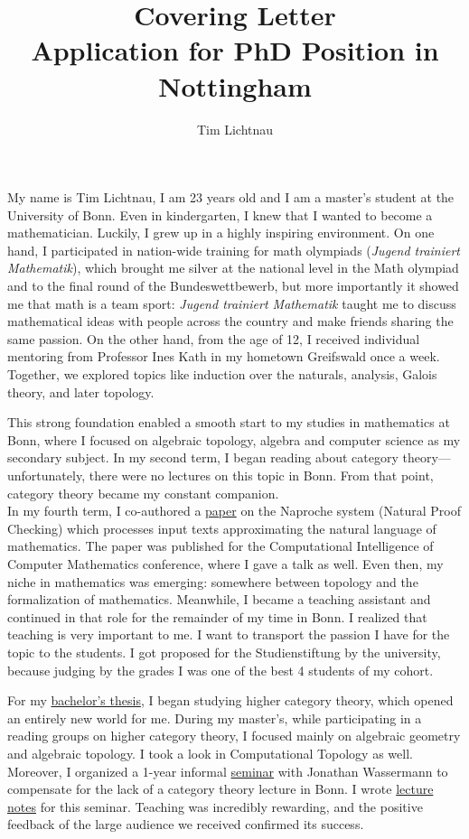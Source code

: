 \documentclass[12pt,headings=small,paper=A4,DIV=calc]{article}
\title{Covering Letter \\ Application for PhD Position in Nottingham}
\author{Tim Lichtnau}
\begin{document}
\maketitle
My name is Tim Lichtnau, I am 23 years old and I am a master's student at the University of Bonn. Even in kindergarten, I knew that I wanted to become a mathematician. Luckily, I grew up in a highly inspiring environment. On one hand, I participated in nation-wide training for math olympiads (\emph{Jugend trainiert Mathematik}), which brought me silver at the national level in the Math olympiad and to the final round of the Bundeswettbewerb, but more importantly it showed me that math is a team sport: \emph{Jugend trainiert Mathematik} taught me to discuss mathematical ideas with people across the country and make friends sharing the same passion. On the other hand, from the age of 12, I received individual mentoring from Professor Ines Kath in my hometown Greifswald once a week. Together, we explored topics like induction over the naturals, analysis, Galois theory, and later topology. 

This strong foundation enabled a smooth start to my studies in mathematics at Bonn, where I focused on algebraic topology, algebra and computer science as my secondary subject. In my second term, I began reading about category theory---unfortunately, there were no lectures on this topic in Bonn. From that point, category theory became my constant companion. \\
In my fourth term, I co-authored a \href{https://ceur-ws.org/Vol-3377/natfom2.pdf}{paper} on the Naproche system (Natural Proof Checking) which processes input texts approximating the natural language of mathematics. The paper was published for the Computational Intelligence of Computer Mathematics conference, where I gave a talk as well. Even then, my niche in mathematics was emerging: somewhere between topology and the formalization of mathematics. Meanwhile, I became a teaching assistant and continued in that role for the remainder of my time in Bonn. I realized that teaching is very important to me. I want to transport the passion I have for the topic to the students. I got proposed for the Studienstiftung by the university, because judging by the grades I was one of the best 4 students of my cohort.  

For my \href{https://uni-bonn.sciebo.de/s/PJUqHE52SnCKJMy}{bachelor's thesis}, I began studying higher category theory, which opened an entirely new world for me. During my master's, while participating in a reading groups on higher category theory, I focused mainly on algebraic geometry and algebraic topology. I took a look in Computational Topology as well. Moreover, I organized a 1-year informal \href{https://uni-bonn.sciebo.de/s/eEHziabNePFwvb4}{seminar} with Jonathan Wassermann to compensate for the lack of a category theory lecture in Bonn. I wrote \href{https://uni-bonn.sciebo.de/s/RzjF14df9WvD3O5}{lecture notes} for this seminar. Teaching was incredibly rewarding, and the positive feedback of the large audience we received confirmed its success. 
\end{document}
